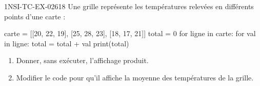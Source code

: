 \begin{exercice}{1NSI-TC-EX-026}{1}{8}
Une grille représente les températures relevées en différents points d'une carte :
\begin{python}
carte = [[20, 22, 19],
          [25, 28, 23],
          [18, 17, 21]]
total = 0
for ligne in carte:
    for val in ligne:
        total = total + val
print(total)
\end{python}
\begin{enumerate}
  \item Donner, sans exécuter, l'affichage produit.
  \item Modifier le code pour qu'il affiche la moyenne des températures de la grille.
\end{enumerate}
\end{exercice}
